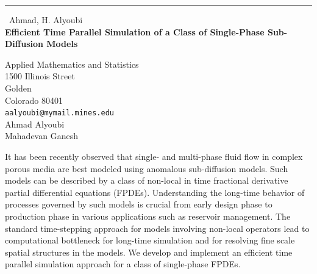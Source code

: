 \documentclass{report}
\begin{document}
\begin{center}
\rule{6in}{1pt} \
{\large Ahmad, H. Alyoubi \\
{\bf Efficient Time Parallel Simulation of a Class of Single-Phase Sub-Diffusion Models}}

Applied Mathematics and Statistics \\ 1500 Illinois Street \\ Golden \\ Colorado 80401
\\
{\tt aalyoubi@mymail.mines.edu}\\
Ahmad Alyoubi\\
Mahadevan Ganesh\end{center}

It has been recently observed that single- and multi-phase fluid flow in
complex porous media are best modeled using anomalous sub-diffusion
models. Such models can be described by a class of non-local in time
fractional derivative partial differential equations (FPDEs).
Understanding the long-time behavior of processes governed by such models
is crucial from early design phase to production phase in various
applications such as reservoir management. The standard time-stepping
approach for models involving non-local operators lead to computational
bottleneck for long-time simulation and for resolving fine scale spatial
structures in the models. We develop and implement an efficient time
parallel simulation approach for a class of single-phase FPDEs.
\end{document}
